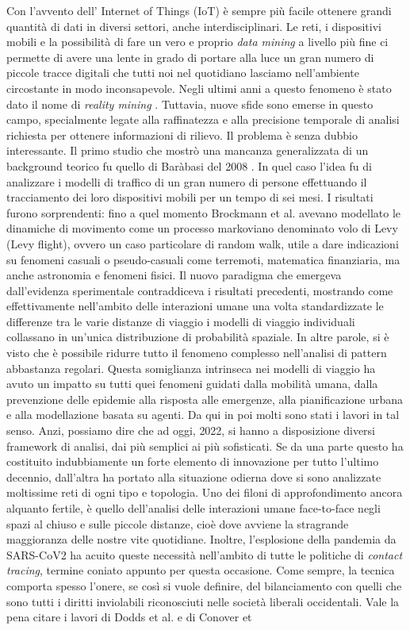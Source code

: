 \documentclass[12pt,twoside]{report}
\begin{document}
	Con l'avvento dell' Internet of Things (IoT) è sempre più facile ottenere grandi quantità di dati in diversi settori, anche interdisciplinari.
	Le reti, i dispositivi mobili e la possibilità di fare un vero e proprio \textit{data mining} a livello più fine ci permette di avere una lente in grado di portare alla luce un gran numero di piccole tracce digitali che tutti noi nel quotidiano lasciamo nell'ambiente circostante in modo inconsapevole. 
	Negli ultimi anni a questo fenomeno è stato dato il nome di \textit{reality mining} \cite{Eagle2006Reality}. Tuttavia, nuove sfide sono emerse in questo campo, specialmente legate alla raffinatezza e alla precisione temporale di analisi richiesta per ottenere informazioni di rilievo.
	Il problema è senza dubbio interessante. Il primo studio che mostrò una mancanza generalizzata di un background teorico fu quello di Baràbasi del 2008 \cite{mobility}. In quel caso l'idea fu di analizzare i modelli di traffico di un gran numero di persone effettuando il tracciamento dei loro dispositivi mobili per un tempo di sei mesi. I risultati furono sorprendenti: fino a quel momento Brockmann et al. \cite{article} avevano modellato le dinamiche di movimento come un processo markoviano denominato volo di Levy (Levy flight), ovvero un caso particolare di random walk, utile a dare indicazioni su fenomeni casuali o pseudo-casuali come terremoti, matematica finanziaria, ma anche astronomia e fenomeni fisici. Il nuovo paradigma che emergeva dall'evidenza sperimentale contraddiceva i risultati precedenti, mostrando come effettivamente nell'ambito delle interazioni umane una volta standardizzate le differenze tra le varie distanze di viaggio i modelli di viaggio individuali collassano in un'unica distribuzione di probabilità spaziale. In altre parole, si è visto che è possibile ridurre tutto il fenomeno complesso nell'analisi di pattern abbastanza regolari. Questa somiglianza intrinseca nei modelli di viaggio ha avuto un impatto su tutti quei fenomeni guidati dalla mobilità umana, dalla prevenzione delle epidemie alla risposta alle emergenze, alla pianificazione urbana e alla modellazione basata su agenti. Da qui in poi molti sono stati i lavori in tal senso. Anzi, possiamo dire che ad oggi, 2022, si hanno a disposizione diversi framework di analisi, dai più semplici ai più sofisticati. Se da una parte questo ha costituito indubbiamente un forte elemento di innovazione per tutto l'ultimo decennio, dall'altra ha portato alla situazione odierna dove si sono analizzate moltissime reti di ogni tipo e topologia. Uno dei filoni di approfondimento ancora alquanto fertile, è quello dell'analisi delle interazioni umane face-to-face negli spazi al chiuso e sulle piccole distanze, cioè dove avviene la stragrande maggioranza delle nostre vite quotidiane. Inoltre, l'esplosione della pandemia da SARS-CoV2\cite{doi:10.1056/NEJMoa2001017} ha acuito queste necessità nell'ambito di tutte le politiche di \textit{contact tracing}, termine coniato appunto per questa occasione. Come sempre, la tecnica comporta spesso l'onere, se così si vuole definire, del bilanciamento con quelli che sono tutti i diritti inviolabili riconosciuti nelle società liberali occidentali. Vale la pena citare i lavori di Dodds et al. \cite{doi:10.1126/science.1081058} e di Conover et 
\end{document}
